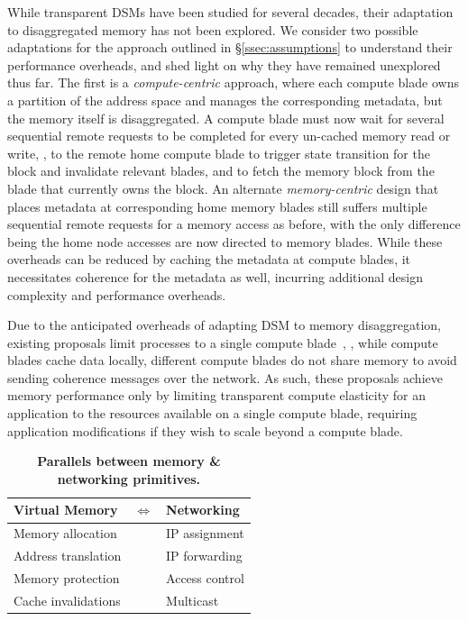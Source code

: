  While transparent DSMs have been studied for several decades, their adaptation to disaggregated memory has not been explored. We consider two possible adaptations for the approach outlined in \S\ref{ssec:assumptions} to understand their performance overheads, and shed light on why they have remained unexplored thus far. The first is a \textit{compute-centric} approach, where each compute blade owns a partition of the address space and manages the corresponding metadata, but the memory itself is disaggregated. A compute blade must now wait for several sequential remote requests to be completed for every un-cached memory read or write, \eg, to the remote home compute blade to trigger state transition for the block and invalidate relevant blades, and to fetch the memory block from the blade that currently owns the block. An alternate \textit{memory-centric} design that places metadata at corresponding home memory blades still suffers multiple sequential remote requests for a memory access as before, with the only difference being the home node accesses are now directed to memory blades. While these overheads can be reduced by caching the metadata at compute blades, it necessitates coherence for the metadata as well, incurring additional design complexity and performance overheads.

 Due to the anticipated overheads of adapting DSM to memory disaggregation, existing proposals limit processes to a single compute blade~\cite{industry0, industry1, memdisagg1, infiniswap, legoos, disagg}, \ie, while compute blades cache data locally, different compute blades do not share memory to avoid sending coherence messages over the network. As such, these proposals achieve memory performance only by limiting transparent compute elasticity for an application to the resources available on a single compute blade, requiring application modifications if they wish to scale beyond a compute blade. 

\begin{table}
    \caption[Parallels between memory \& networking primitives]{\small \textbf{Parallels between memory \& networking primitives.}}\vspace{-1em}
    \label{table:isomorph}
    \centering
    \scriptsize
    \renewcommand{\arraystretch}{1.2}
    \begin{tabular}{p{2cm} p{0.7cm}p{2cm}}
      \hline
      \textbf{Virtual Memory} &$\Longleftrightarrow$ &\textbf{Networking} \\\hline\hline
      Memory allocation&&IP assignment\\
      Address translation &&IP forwarding\\
      Memory protection  &&Access control\\
      Cache invalidations &&Multicast\\
      \hline
    \end{tabular}
    \vspace{-1em}
\end{table}

